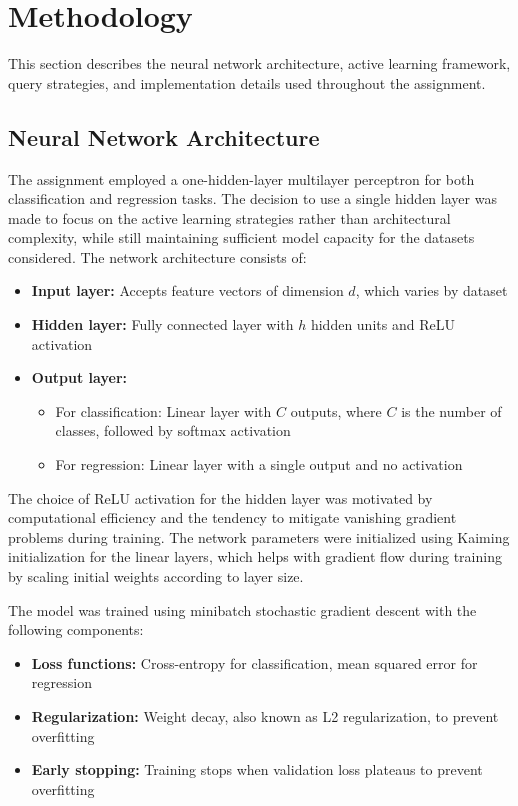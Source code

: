 \documentclass[conference]{IEEEtran}
\begin{document}
\section{Methodology}

This section describes the neural network architecture, active learning framework, query strategies, and implementation details used throughout the assignment.

\subsection{Neural Network Architecture}

The assignment employed a one-hidden-layer multilayer perceptron for both classification and regression tasks. The decision to use a single hidden layer was made to focus on the active learning strategies rather than architectural complexity, while still maintaining sufficient model capacity for the datasets considered. The network architecture consists of:

\begin{itemize}
\item \textbf{Input layer:} Accepts feature vectors of dimension $d$, which varies by dataset
\item \textbf{Hidden layer:} Fully connected layer with $h$ hidden units and ReLU activation
\item \textbf{Output layer:} 
  \begin{itemize}
  \item For classification: Linear layer with $C$ outputs, where $C$ is the number of classes, followed by softmax activation
  \item For regression: Linear layer with a single output and no activation
  \end{itemize}
\end{itemize}

The choice of ReLU activation for the hidden layer was motivated by computational efficiency and the tendency to mitigate vanishing gradient problems during training. The network parameters were initialized using Kaiming initialization for the linear layers, which helps with gradient flow during training by scaling initial weights according to layer size.

The model was trained using minibatch stochastic gradient descent with the following components:

\begin{itemize}
\item \textbf{Loss functions:} Cross-entropy for classification, mean squared error for regression
\item \textbf{Regularization:} Weight decay, also known as L2 regularization, to prevent overfitting
\item \textbf{Early stopping:} Training stops when validation loss plateaus to prevent overfitting
\end{itemize}
\end{document}
